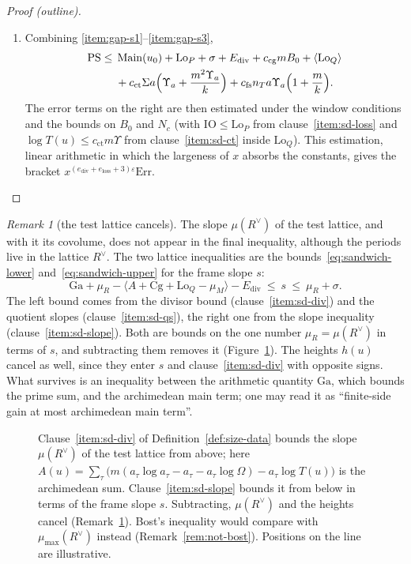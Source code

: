 \documentclass[11pt]{amsbook}
\theoremstyle{plain}
\theoremstyle{definition}
\theoremstyle{remark}
\newtheorem{remark}[theorem]{Remark}
\numberwithin{equation}{section}
\numberwithin{figure}{chapter}
\numberwithin{table}{chapter}
\newcommand{\eps}{\varepsilon}
\newcommand{\PS}{\mathrm{PS}}
\newcommand{\Err}{\mathrm{Err}}
\newcommand{\Main}{\operatorname{Main}}
\newcommand{\Cg}{\mathrm{Cg}}
\newcommand{\lgv}{\operatorname{lg}}
\newcommand{\Ga}{\mathrm{Ga}}
\newcommand{\IO}{\mathrm{IO}}
\newcommand{\Lo}{\mathrm{Lo}}
\begin{document}
\begin{proof}[Proof (outline)]
\begin{enumerate}[label=(\arabic*)]
\[\]
the terms $m\,\Sigma a\log(\pi/v)$ and $m\,\Sigma a\log(v/\pi)$
cancel, the terms $\pm m\,\Sigma a\,\lgv$ cancel, and what remains of
the archimedean sum and of the weights in clause~\ref{item:sd-ct} is
$\Main(u_0)$. Clause~\ref{item:sd-fs} bounds $-\mu_M(u)$ by
$c_{\mathrm{fs}}n_Ta\Upsilon_a(1+m/k)$.
\item Combining \ref{item:gap-s1}--\ref{item:gap-s3},
\[
\begin{aligned}
\PS\le{}&\Main(u_0)+\Lo_P+\sigma+E_{\mathrm{div}}
+c_{\mathrm{cg}}mB_0+\langle\Lo_Q\rangle\\
&+c_{\mathrm{ct}}\Sigma a\Bigl(\Upsilon_a+\frac{m^2\Upsilon_a}k
\Bigr)+c_{\mathrm{fs}}n_Ta\Upsilon_a\Bigl(1+\frac mk\Bigr).
\end{aligned}
\]
The error terms on the right are then estimated under the window
conditions and the bounds on $B_0$ and $N_c$ (with
$\IO\le\Lo_P$ from clause~\ref{item:sd-loss} and $\log T(u)\le c_{\mathrm{ct}}
m\Upsilon$ from clause~\ref{item:sd-ct} inside $\Lo_Q$). This estimation, linear
arithmetic in which the largeness of $x$ absorbs the constants, gives
the bracket $x^{(e_{\mathrm{div}}+e_{\mathrm{loss}}+3)\eps}\Err$.
\end{enumerate}
\end{proof}

\begin{remark}[the test lattice cancels]\label{rem:cancel}
The slope $\mu(R^\vee)$ of the test lattice, and with it its
covolume, does not appear in the final inequality, although the
periods live in the lattice $R^\vee$. The
two lattice inequalities are the bounds~\eqref{eq:sandwich-lower}
and~\eqref{eq:sandwich-upper} for the frame slope $s$:
\[
\Ga+\mu_R-\bigl\langle A+\Cg+\Lo_Q-\mu_M\bigr\rangle-E_{\mathrm{div}}
\ \le\ s\ \le\ \mu_R+\sigma.
\]
The left bound comes from the divisor bound (clause~\ref{item:sd-div}) and the
quotient slopes (clause~\ref{item:sd-qs}), the right one from the slope
inequality (clause~\ref{item:sd-slope}). Both are bounds on the one number
$\mu_R=\mu(R^\vee)$ in terms of $s$, and subtracting them removes it
(Figure~\ref{fig:sandwich}).
The heights $h(u)$ cancel as well, since they enter $s$ and
clause~\ref{item:sd-div} with opposite signs. What survives is an inequality
between the arithmetic quantity $\Ga$, which bounds the prime sum, and
the archimedean main term; one may read it as ``finite-side gain at
most archimedean main term''.
\end{remark}

\begin{figure}[htbp]
\centering

\caption{Clause~\ref{item:sd-div} of Definition~\ref{def:size-data} bounds the
slope
$\mu(R^\vee)$ of the test lattice from above; here
$A(u)=\sum_\tau\bigl(m(a_\tau\log a_\tau-a_\tau-a_\tau\log\Omega)
-a_\tau\log T(u)\bigr)$ is the archimedean sum. Clause~\ref{item:sd-slope}
bounds it
from below in terms of the frame slope $s$. Subtracting, $\mu(R^\vee)$
and the heights cancel (Remark~\ref{rem:cancel}). Bost's inequality
would compare with $\mu_{\max}(R^\vee)$ instead
(Remark~\ref{rem:not-bost}). Positions on the line are
illustrative.}
\label{fig:sandwich}
\end{figure}
\end{document}
